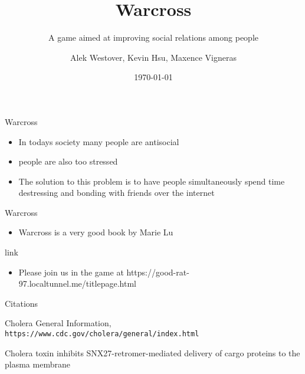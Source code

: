 \documentclass{beamer}
\title{Warcross}
\subtitle{A game aimed at improving social relations among people}
\author{Alek Westover, Kevin Hsu, Maxence Vigneras}
\institute{MA Hacks}
\date{\today}
\begin{document}
\begin{frame}
\titlepage
\end{frame}

\begin{frame}[t]{Warcross}
	\begin{itemize}
		\item In todays society many people are antisocial		
			\item people are also too stressed
		\item The solution to this problem is to have people simultaneously spend time destressing and bonding with friends over the internet
	\end{itemize}
\end{frame}

\begin{frame}[t]{Warcross}
	\begin{itemize}
			\item Warcross is a very good book by Marie Lu
	\end{itemize}
\end{frame}

\begin{frame}[t]{link}
	\begin{itemize}
		\item Please join us in the game at https://good-rat-97.localtunnel.me/titlepage.html
	\end{itemize}
\end{frame}

\begin{frame}[t]{Citations}
\begin{thebibliography}{2}
	Cholera General Information,
	\\\texttt{https://www.cdc.gov/cholera/general/index.html}
	
	Cholera toxin inhibits SNX27-retromer-mediated delivery of cargo proteins to the plasma membrane
	\\
\end{thebibliography}
\end{frame}
\end{document}
